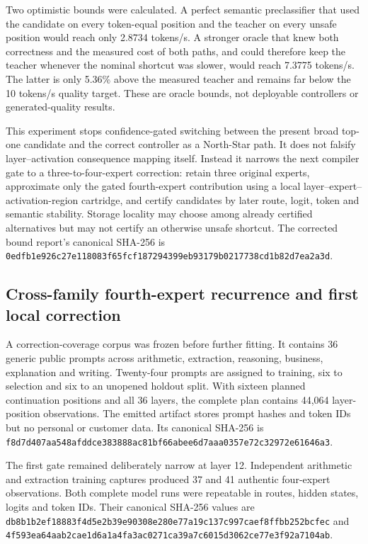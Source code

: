 Two optimistic bounds were calculated.  A perfect semantic preclassifier that
used the candidate on every token-equal position and the teacher on every
unsafe position would reach only 2.8734 tokens/s.  A stronger oracle that knew
both correctness and the measured cost of both paths, and could therefore keep
the teacher whenever the nominal shortcut was slower, would reach 7.3775
tokens/s.  The latter is only 5.36\% above the measured teacher and remains far
below the 10 tokens/s quality target.  These are oracle bounds, not deployable
controllers or generated-quality results.

This experiment stops confidence-gated switching between the present broad
top-one candidate and the correct controller as a North-Star path.  It does not
falsify layer--activation consequence mapping itself.  Instead it narrows the
next compiler gate to a three-to-four-expert correction: retain three original
experts, approximate only the gated fourth-expert contribution using a local
layer--expert--activation-region cartridge, and certify candidates by later
route, logit, token and semantic stability.  Storage locality may choose among
already certified alternatives but may not certify an otherwise unsafe
shortcut.  The corrected bound report's canonical SHA-256 is
\texttt{0edfb1e926c27e118083f65fcf187294399eb93179b0217738cd1b82d7ea2a3d}.

\subsection{Cross-family fourth-expert recurrence and first local correction}

A correction-coverage corpus was frozen before further fitting.  It contains
36 generic public prompts across arithmetic, extraction, reasoning, business,
explanation and writing.  Twenty-four prompts are assigned to training, six to
selection and six to an unopened holdout split.  With sixteen planned
continuation positions and all 36 layers, the complete plan contains 44,064
layer-position observations.  The emitted artifact stores prompt hashes and
token IDs but no personal or customer data.  Its canonical SHA-256 is
\texttt{f8d7d407aa548afddce383888ac81bf66abee6d7aaa0357e72c32972e61646a3}.

The first gate remained deliberately narrow at layer 12.  Independent
arithmetic and extraction training captures produced 37 and 41 authentic
four-expert observations.  Both complete model runs were repeatable in routes,
hidden states, logits and token IDs.  Their canonical SHA-256 values are
\texttt{db8b1b2ef18883f4d5e2b39e90308e280e77a19c137c997caef8ffbb252bcfec}
and
\texttt{4f593ea64aab2cae1d6a1a4fa3ac0271ca39a7c6015d3062ce77e3f92a7104ab}.

